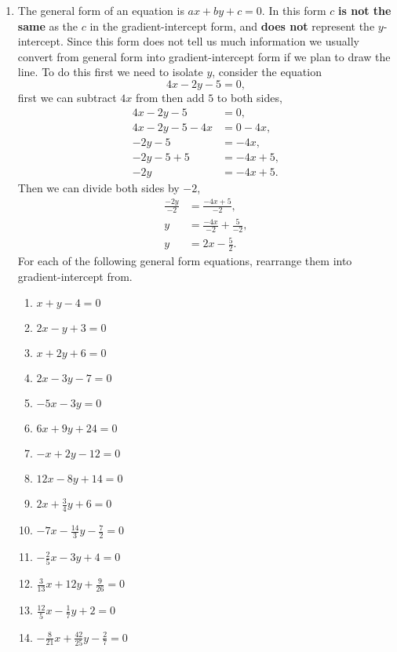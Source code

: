 \documentclass[a4paper,12pt]{article}
\begin{document}
\begin{enumerate}
\item The general form of an equation is $ax + by + c = 0$.
In this form $c$ \textbf{is not the same} as the $c$ in the 
gradient-intercept form, and \textbf{does not} represent the
$y$-intercept. Since this form does not tell us much information
we usually convert from general form into gradient-intercept 
form if we plan to draw the line. To do this first we need
to isolate $y$, consider the equation
$$4x - 2y - 5 = 0,$$
first we can subtract $4x$ from then add $5$ to both
sides,
\begin{align*}
4x - 2y - 5 &= 0, \\
4x - 2y - 5 - 4x &= 0 - 4x, \\
-2y - 5 &= -4x, \\
-2y - 5 + 5 &= -4x + 5, \\
-2y &= -4x + 5.
\end{align*}
Then we can divide both sides by $-2$,
\begin{align*}
\frac{-2y}{-2} &= \frac{-4x + 5}{-2}, \\
y &= \frac{-4x}{-2} + \frac{5}{-2}, \\
y &= 2x - \frac{5}{2}.
\end{align*}
For each of the following general form equations, rearrange 
them into gradient-intercept from.
    \begin{multicols}{2}
    \begin{enumerate}
    \item $x + y - 4 = 0$
    \item $2x - y + 3 = 0$
    \item $x + 2y + 6 = 0$
    \item $2x - 3y - 7 = 0$
    \item $-5x - 3y = 0$
    \item $6x + 9y + 24 = 0$
    \item $-x + 2y - 12 = 0$
    \item $12x - 8y + 14 = 0$
    \item $2x + \frac{3}{4}y + 6 = 0$
    \item $-7x - \frac{14}{3}y - \frac{7}{2} = 0$
    \item $-\frac{2}{5}x - 3y + 4 = 0$
    \item $\frac{3}{13}x + 12y + \frac{9}{26} = 0$
    \item $\frac{12}{5}x - \frac{1}{7}y + 2 = 0$
    \item $-\frac{8}{21}x + \frac{42}{25}y - \frac{2}{7} = 0$
    \end{enumerate}
    \end{multicols}


\end{enumerate}
\end{document}
